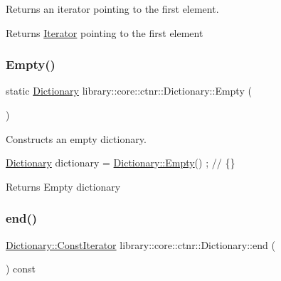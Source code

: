 Returns an iterator pointing to the first element. 

\begin{DoxyReturn}{Returns}
\hyperlink{classlibrary_1_1core_1_1ctnr_1_1_dictionary_1_1_iterator}{Iterator} pointing to the first element 
\end{DoxyReturn}
\mbox{\label{classlibrary_1_1core_1_1ctnr_1_1_dictionary_a236f8efd7a01e7a91061e8ed933112b7}} 
\subsubsection{\texorpdfstring{Empty()}{Empty()}}
{\footnotesize\ttfamily static \hyperlink{classlibrary_1_1core_1_1ctnr_1_1_dictionary}{Dictionary} library\+::core\+::ctnr\+::\+Dictionary\+::\+Empty (\begin{DoxyParamCaption}{ }\end{DoxyParamCaption})\hspace{0.3cm}{\ttfamily [static]}}



Constructs an empty dictionary. 


\begin{DoxyCode}
\hyperlink{classlibrary_1_1core_1_1ctnr_1_1_dictionary_a823a08112d9ee271f9fa5833f030ea1a}{Dictionary} dictionary = \hyperlink{classlibrary_1_1core_1_1ctnr_1_1_dictionary_a236f8efd7a01e7a91061e8ed933112b7}{Dictionary::Empty}() ; \textcolor{comment}{// \{\}}
\end{DoxyCode}


\begin{DoxyReturn}{Returns}
Empty dictionary 
\end{DoxyReturn}
\mbox{\label{classlibrary_1_1core_1_1ctnr_1_1_dictionary_ace2fb3bdb88a059090e8b0265d97e57e}} 
\subsubsection{\texorpdfstring{end()}{end()}\hspace{0.1cm}{\footnotesize\ttfamily [1/2]}}
{\footnotesize\ttfamily \hyperlink{classlibrary_1_1core_1_1ctnr_1_1_dictionary_1_1_const_iterator}{Dictionary\+::\+Const\+Iterator} library\+::core\+::ctnr\+::\+Dictionary\+::end (\begin{DoxyParamCaption}{ }\end{DoxyParamCaption}) const}



